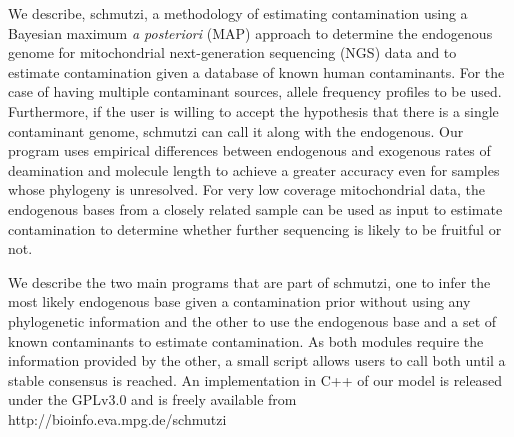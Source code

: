 \documentclass[a4paper,12pt]{article}
\begin{document}
We describe, schmutzi, a methodology of estimating contamination using a Bayesian maximum {\it a posteriori} (MAP) approach to determine the endogenous genome for mitochondrial next-generation sequencing (NGS) data and to estimate contamination given a database of known human contaminants. For the case of having multiple contaminant sources, allele frequency profiles to be used. Furthermore, if the user is willing to accept the hypothesis that there is a single contaminant genome, schmutzi can call it along with the endogenous. Our program uses empirical differences between endogenous and exogenous rates of deamination and molecule length to achieve a greater accuracy even for samples whose phylogeny is unresolved. For very low coverage mitochondrial data, the endogenous bases from a closely related sample can be used as input to estimate contamination to determine whether further sequencing is likely to be fruitful or not.

We describe the two main programs that are part of schmutzi, one to infer the most likely endogenous base given a contamination prior without using any phylogenetic information and the other to use the endogenous base and a set of known contaminants to estimate contamination. As both modules require the information provided by the other, a small script allows users to call both until a stable consensus is reached. An implementation in C++ of our model is released under the GPLv3.0 and is freely available from http://bioinfo.eva.mpg.de/schmutzi

\end{document}
